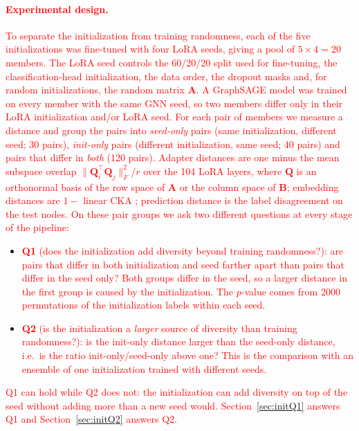 \documentclass[a4paper,fleqn]{cas-sc}
\newcommand{\revone}[1]{\textcolor{red}{#1}}   %
\begin{document}
\paragraph{\revone{Experimental design.}}
\revone{To separate the initialization from training randomness, each of the five initializations was fine-tuned with four LoRA seeds, giving a pool of $5\times4=20$ members.
The LoRA seed controls the 60/20/20 split used for fine-tuning, the classification-head initialization, the data order, the dropout masks and, for random initializations, the random matrix $\mathbf{A}$. A GraphSAGE model was trained on every member with the same GNN seed, so two members differ only in their LoRA initialization and/or LoRA seed. For each pair of members we measure a distance and group the pairs into \emph{seed-only} pairs (same initialization, different seed; 30 pairs), \emph{init-only} pairs (different initialization, same seed; 40 pairs) and pairs that differ in \emph{both} (120 pairs). Adapter distances are one minus the mean subspace overlap $\|\mathbf{Q}_i^{\top}\mathbf{Q}_j\|_F^2/r$ over the 104 LoRA layers, where $\mathbf{Q}$ is an orthonormal basis of the row space of $\mathbf{A}$ or the column space of $\mathbf{B}$; embedding distances are $1-$ linear CKA \citep{kornblith2019cka}; prediction distance is the label disagreement on the test nodes. On these pair groups we ask two different questions at every stage of the pipeline:}
\begin{itemize}
    \item \revone{\textbf{Q1} (does the initialization add diversity beyond training randomness?): are pairs that differ in both initialization and seed farther apart than pairs that differ in the seed only? Both groups differ in the seed, so a larger distance in the first group is caused by the initialization. The $p$-value comes from 2000 permutations of the initialization labels within each seed.}
    \item \revone{\textbf{Q2} (is the initialization a \emph{larger} source of diversity than training randomness?): is the init-only distance larger than the seed-only distance, i.e.\ is the ratio init-only/seed-only above one? This is the comparison with an ensemble of one initialization trained with different seeds.}
\end{itemize}
\revone{Q1 can hold while Q2 does not: the initialization can add diversity on top of the seed without adding more than a new seed would. Section~\ref{sec:initQ1} answers Q1 and Section~\ref{sec:initQ2} answers Q2.}
\end{document}
